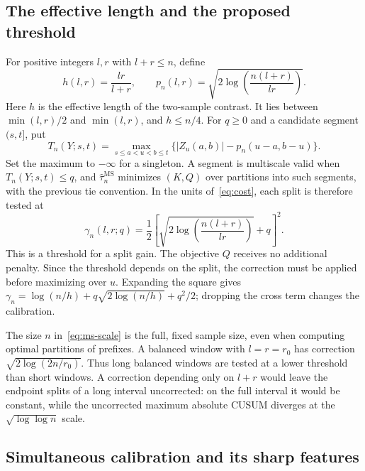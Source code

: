\documentclass[pdflatex,sn-mathphys-num]{sn-jnl}
\theoremstyle{thmstyleone}
\theoremstyle{thmstyletwo}
\begin{document}
\subsection{The effective length and the proposed threshold}

For positive integers $l,r$ with $l+r\le n$, define
\begin{equation}\label{eq:ms-scale}
h(l,r)=\frac{lr}{l+r},\qquad
p_n(l,r)=\sqrt{2\log\!\left(\frac{n(l+r)}{lr}\right)}.
\end{equation}
Here $h$ is the effective length of the two-sample contrast. It lies between
$\min(l,r)/2$ and $\min(l,r)$, and $h\le n/4$.
For $q\ge0$ and a candidate segment $(s,t]$, put
\begin{equation}\label{eq:ms-statistic}
T_n(Y;s,t)=\max_{s\le a<u<b\le t}
\bigl\{|Z_u(a,b)|-p_n(u-a,b-u)\bigr\}.
\end{equation}
Set the maximum to $-\infty$ for a singleton. A segment is multiscale valid
when $T_n(Y;s,t)\le q$, and $\widehat\tau_n^{\mathrm{MS}}$ minimizes $(K,Q)$
over partitions into such segments, with the previous tie convention.
In the units of~\eqref{eq:cost}, each split is therefore tested at
\begin{equation}\label{eq:ms-penalty}
\boxed{\displaystyle
\gamma_n(l,r;q)=\frac12\left[
\sqrt{2\log\!\left(\frac{n(l+r)}{lr}\right)}+q\right]^2.}
\end{equation}
This is a threshold for a split gain. The objective $Q$ receives no additional
penalty. Since the threshold depends on the split, the correction must be
applied before maximizing over $u$. Expanding the square gives
$\gamma_n=\log(n/h)+q\sqrt{2\log(n/h)}+q^2/2$; dropping the cross term changes
the calibration.

The size $n$ in~\eqref{eq:ms-scale} is the full, fixed sample size, even when
computing optimal partitions of prefixes. A balanced window with $l=r=r_0$
has correction $\sqrt{2\log(2n/r_0)}$. Thus long balanced windows are tested
at a lower threshold than short windows. A correction depending only on
$l+r$ would leave the endpoint splits of a long interval uncorrected:
on the full interval it would be constant, while the uncorrected maximum
absolute CUSUM diverges at the $\sqrt{\log\log n}$ scale.

\subsection{Simultaneous calibration and its sharp features}
\end{document}
